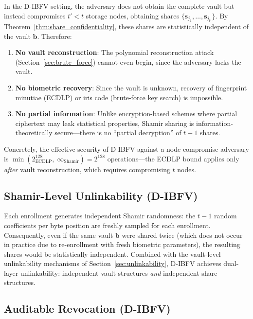 \documentclass[3p,twocolumn]{elsarticle}
\newcommand{\DIBFV}{\textsf{D-IBFV}}
\begin{document}
In the \DIBFV{} setting, the adversary does not obtain the complete vault but instead compromises $t' < t$ storage nodes, obtaining shares $\{\mathbf{s}_{j_1}, \ldots, \mathbf{s}_{j_{t'}}\}$. By Theorem~\ref{thm:share_confidentiality}, these shares are statistically independent of the vault $\mathbf{b}$. Therefore:

\begin{enumerate}
    \item \textbf{No vault reconstruction}: The polynomial reconstruction attack (Section~\ref{sec:brute_force}) cannot even begin, since the adversary lacks the vault.
    \item \textbf{No biometric recovery}: Since the vault is unknown, recovery of fingerprint minutiae (ECDLP) or iris code (brute-force key search) is impossible.
    \item \textbf{No partial information}: Unlike encryption-based schemes where partial ciphertext may leak statistical properties, Shamir sharing is information-theoretically secure---there is no ``partial decryption'' of $t{-}1$ shares.
\end{enumerate}

\noindent Concretely, the effective security of \DIBFV{} against a node-compromise adversary is $\min(2^{128}_{\text{ECDLP}},\; \infty_{\text{Shamir}}) = 2^{128}$ operations---the ECDLP bound applies only \emph{after} vault reconstruction, which requires compromising $t$ nodes.

\subsection{Shamir-Level Unlinkability (\DIBFV{})}
\label{sec:shamir_unlinkability}

Each enrollment generates independent Shamir randomness: the $t{-}1$ random coefficients per byte position are freshly sampled for each enrollment. Consequently, even if the same vault $\mathbf{b}$ were shared twice (which does not occur in practice due to re-enrollment with fresh biometric parameters), the resulting shares would be statistically independent. Combined with the vault-level unlinkability mechanisms of Section~\ref{sec:unlinkability}, \DIBFV{} achieves dual-layer unlinkability: independent vault structures \emph{and} independent share structures.

\subsection{Auditable Revocation (\DIBFV{})}
\label{sec:auditable_revocation}
\end{document}
